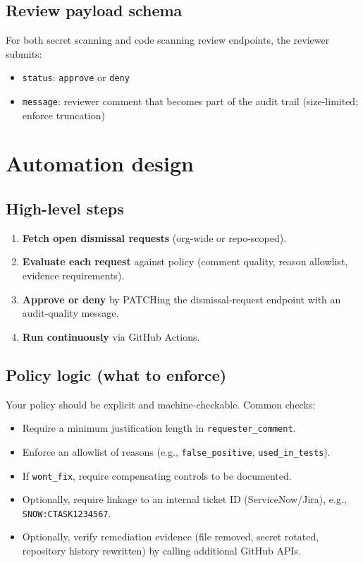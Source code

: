 \documentclass[11pt]{article}
\begin{document}
\subsection{Review payload schema}

For both secret scanning and code scanning review endpoints, the reviewer submits:
\begin{itemize}
  \item \texttt{status}: \texttt{approve} or \texttt{deny}
  \item \texttt{message}: reviewer comment that becomes part of the audit trail (size-limited; enforce truncation)
\end{itemize}

\section{Automation design}

\subsection{High-level steps}

\begin{enumerate}
  \item \textbf{Fetch open dismissal requests} (org-wide or repo-scoped).
  \item \textbf{Evaluate each request} against policy (comment quality, reason allowlist, evidence requirements).
  \item \textbf{Approve or deny} by PATCHing the dismissal-request endpoint with an audit-quality message.
  \item \textbf{Run continuously} via GitHub Actions.
\end{enumerate}

\subsection{Policy logic (what to enforce)}

Your policy should be explicit and machine-checkable. Common checks:
\begin{itemize}
  \item Require a minimum justification length in \texttt{requester\_comment}.
  \item Enforce an allowlist of reasons (e.g., \texttt{false\_positive}, \texttt{used\_in\_tests}).
  \item If \texttt{wont\_fix}, require compensating controls to be documented.
  \item Optionally, require linkage to an internal ticket ID (ServiceNow/Jira), e.g., \nolinkurl{SNOW:CTASK1234567}.
  \item Optionally, verify remediation evidence (file removed, secret rotated, repository history rewritten) by calling additional GitHub APIs.
\end{itemize}
\end{document}
